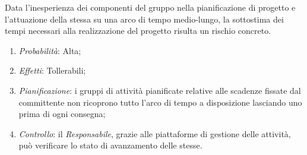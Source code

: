 Data l'inesperienza dei componenti del gruppo nella pianificazione di progetto e l'attuazione della stessa su una arco di tempo medio-lungo, la sottostima dei tempi necessari alla realizzazione del progetto risulta un rischio concreto.

\begin{enumerate}
\item \textit{Probabilità}: Alta;
\item \textit{Effetti}: Tollerabili;
\item \textit{Pianificazione}: i gruppi di attività pianificate relative alle scadenze fissate dal committente non ricoprono tutto l'arco di tempo a disposizione lasciando uno  prima di ogni consegna; 
\item \textit{Controllo}: il \textit{Responsabile}, grazie alle piattaforme di gestione delle attività, può verificare lo stato di avanzamento delle stesse.
\end{enumerate}
